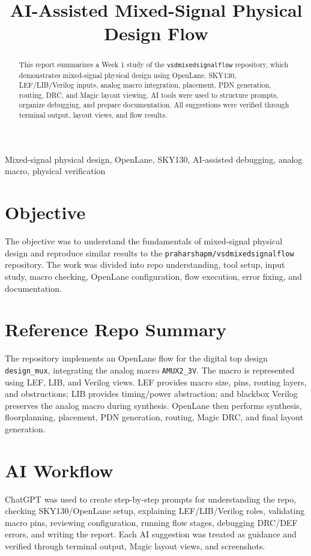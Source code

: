 \documentclass[10pt,conference]{IEEEtran}
\title{AI-Assisted Mixed-Signal Physical Design Flow}
\author{\IEEEauthorblockN{Chinmaya Sharma}
\IEEEauthorblockA{Week 1 Task Report -- Mixed-Signal Physical Design}}
\date{}
\begin{document}
\maketitle

\begin{abstract}
This report summarizes a Week 1 study of the \texttt{vsdmixedsignalflow} repository, which demonstrates mixed-signal physical design using OpenLane, SKY130, LEF/LIB/Verilog inputs, analog macro integration, placement, PDN generation, routing, DRC, and Magic layout viewing. AI tools were used to structure prompts, organize debugging, and prepare documentation. All suggestions were verified through terminal output, layout views, and flow results.
\end{abstract}

\begin{IEEEkeywords}
Mixed-signal physical design, OpenLane, SKY130, AI-assisted debugging, analog macro, physical verification
\end{IEEEkeywords}

\section{Objective}
The objective was to understand the fundamentals of mixed-signal physical design and reproduce similar results to the \texttt{praharshapm/vsdmixedsignalflow} repository. The work was divided into repo understanding, tool setup, input study, macro checking, OpenLane configuration, flow execution, error fixing, and documentation.

\section{Reference Repo Summary}
The repository implements an OpenLane flow for the digital top design \texttt{design\_mux}, integrating the analog macro \texttt{AMUX2\_3V}. The macro is represented using LEF, LIB, and Verilog views. LEF provides macro size, pins, routing layers, and obstructions; LIB provides timing/power abstraction; and blackbox Verilog preserves the analog macro during synthesis. OpenLane then performs synthesis, floorplanning, placement, PDN generation, routing, Magic DRC, and final layout generation.

\section{AI Workflow}
ChatGPT was used to create step-by-step prompts for understanding the repo, checking SKY130/OpenLane setup, explaining LEF/LIB/Verilog roles, validating macro pins, reviewing configuration, running flow stages, debugging DRC/DEF errors, and writing the report. Each AI suggestion was treated as guidance and verified through terminal output, Magic layout views, and screenshots.
\end{document}
